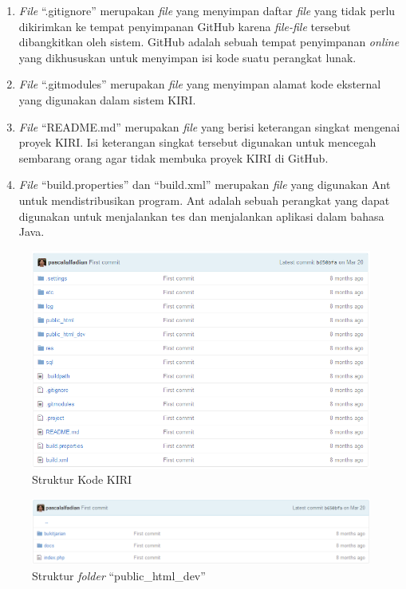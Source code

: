 \begin{enumerate}
	\item \textit{File} ``.gitignore'' merupakan \textit{file} yang menyimpan daftar \textit{file} yang tidak perlu dikirimkan ke tempat penyimpanan GitHub karena \textit{file-file} tersebut dibangkitkan oleh sistem. GitHub adalah sebuah tempat penyimpanan \textit{online} yang dikhususkan untuk menyimpan isi kode suatu perangkat lunak\cite{github}.
	\item \textit{File} ``.gitmodules'' merupakan \textit{file} yang menyimpan alamat kode eksternal yang digunakan dalam sistem KIRI.
	\item \textit{File} ``README.md'' merupakan \textit{file} yang berisi keterangan singkat mengenai proyek KIRI. Isi keterangan singkat tersebut digunakan untuk mencegah sembarang orang agar tidak membuka proyek KIRI di GitHub.
	\item \textit{File} ``build.properties'' dan ``build.xml'' merupakan \textit{file} yang digunakan Ant untuk mendistribusikan program. Ant adalah sebuah perangkat yang dapat digunakan untuk menjalankan tes dan menjalankan aplikasi dalam bahasa Java\cite{ant}.
\end{enumerate}

\begin{figure}[htbp]
	\centering
		\includegraphics[scale=0.5]{Gambar/3_strukturkiri.png}
	\caption{Struktur Kode KIRI}
	\label{fig:3_strukturkiri}
\end{figure}

\begin{figure}[htbp]
	\centering
		\includegraphics[scale=0.5]{Gambar/3_public_html_dev.png}
	\caption{Struktur \textit{folder} ``public\_html\_dev''}
	\label{fig:3_public_html_dev}
\end{figure}

